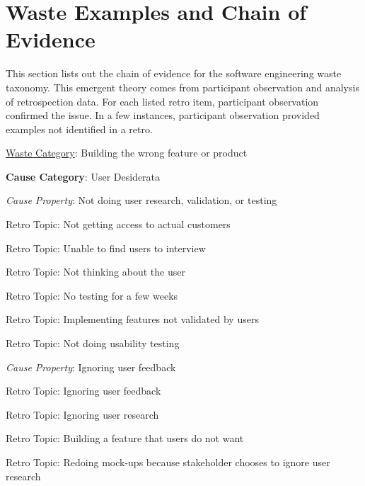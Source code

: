 
\chapter{Waste Examples and Chain of Evidence}
\label{AppendixChainOfEvidence}

This section lists out the chain of evidence for the software engineering waste taxonomy. This emergent theory comes from participant observation and analysis of retrospection data. For each listed retro item, participant observation confirmed the issue. In a few instances, participant observation provided examples not identified in a retro.




\underline{Waste Category}: Building the wrong feature or product

\quad \textbf{Cause Category}: User Desiderata

\quad \quad \textit{Cause Property}: Not doing user research, validation, or testing

\quad \quad \quad Retro Topic: Not getting access to actual customers

\quad \quad \quad Retro Topic: Unable to find users to interview

\quad \quad \quad Retro Topic: Not thinking about the user

\quad \quad \quad Retro Topic: No testing for a few weeks

\quad \quad \quad Retro Topic: Implementing features not validated by users

\quad \quad \quad Retro Topic: Not doing usability testing

\quad \quad \textit{Cause Property}: Ignoring user feedback

\quad \quad \quad Retro Topic: Ignoring user feedback

\quad \quad \quad Retro Topic: Ignoring user research

\quad \quad \quad Retro Topic: Building a feature that users do not want

\quad \quad \quad Retro Topic: Redoing mock-ups because stakeholder chooses to ignore user research


